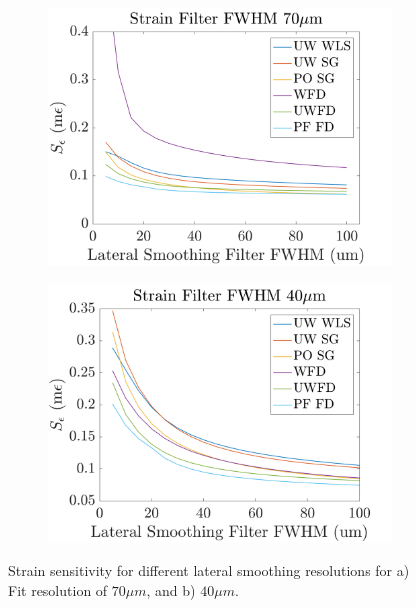 \begin{figure}[t!]
	\centering
    \begin{subfigure}{0.49\textwidth}
    	\centering
        \includegraphics[width=\textwidth]{figures/sensitivity_fr70.png}
    \end{subfigure}
    \begin{subfigure}{0.49\textwidth}
    	\centering
        \includegraphics[width=\textwidth]{figures/sensitivity_fr40.png}
    \end{subfigure}
    \caption{Strain sensitivity for different lateral smoothing resolutions for a) Fit resolution of $70\mu m$, and b) $40\mu m$.}
    \label{sensitivity_2}	
\end{figure}

